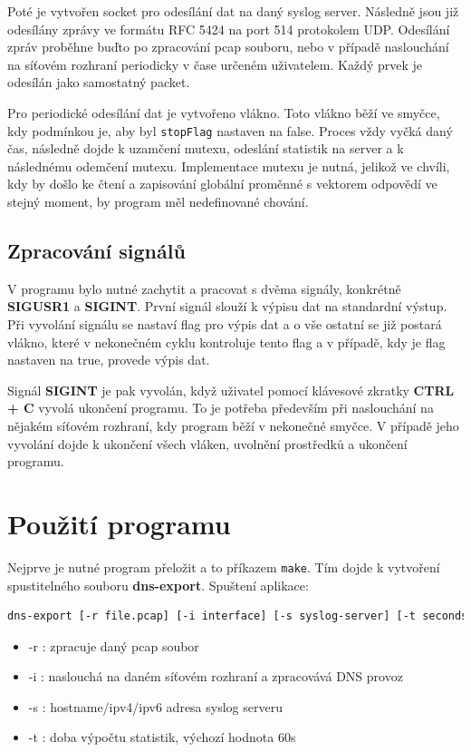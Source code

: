 \documentclass[a4paper, 11pt]{article}
\begin{document}
Poté je vytvořen socket pro odesílání dat na daný syslog server. Následně jsou již odesílány zprávy ve formátu RFC 5424 \cite{RFC5424} na port 514 protokolem UDP. Odesílání zpráv proběhne buďto po zpracování pcap souboru, nebo v případě naslouchání na síťovém rozhraní periodicky v čase určeném uživatelem. Každý prvek je odesílán jako samostatný packet.

Pro periodické odesílání dat je vytvořeno vlákno. Toto vlákno běží ve smyčce, kdy podmínkou je, aby byl \verb|stopFlag| nastaven na false. Proces vždy vyčká daný čas, následně dojde k uzamčení mutexu, odeslání statistik na server a k následnému odemčení mutexu. Implementace mutexu je nutná, jelikož ve chvíli, kdy by došlo ke čtení a zapisování globální proměnné s vektorem odpovědí ve stejný moment, by program měl nedefinované chování. 

\subsection{Zpracování signálů}
V programu bylo nutné zachytit a pracovat s dvěma signály, konkrétně \textbf{SIGUSR1} a \textbf{SIGINT}. První signál slouží k výpisu dat na standardní výstup. Při vyvolání signálu se nastaví flag pro výpis dat a o vše ostatní se již postará vlákno, které v nekonečném cyklu kontroluje tento flag a v případě, kdy je flag nastaven na true, provede výpis dat.

Signál \textbf{SIGINT} je pak vyvolán, když uživatel pomocí klávesové zkratky \textbf{CTRL + C} vyvolá ukončení programu. To je potřeba především při naslouchání na nějakém síťovém rozhraní, kdy program běží v nekonečné smyčce. V případě jeho vyvolání dojde k ukončení všech vláken, uvolnění prostředků a ukončení programu.
\newpage
\section{Použití programu}
Nejprve je nutné program přeložit a to příkazem \verb|make|. Tím dojde k vytvoření spustitelného souboru \textbf{dns-export}. Spuštení aplikace:
\begin{lstlisting}[language=bash]
 dns-export [-r file.pcap] [-i interface] [-s syslog-server] [-t seconds]
\end{lstlisting}
\begin{itemize}
  \item -r : zpracuje daný pcap soubor
  \item -i : naslouchá na daném síťovém rozhraní a zpracovává DNS provoz
  \item -s : hostname/ipv4/ipv6 adresa syslog serveru
  \item -t : doba výpočtu statistik, výchozí hodnota 60s
\end{itemize}
\end{document}
